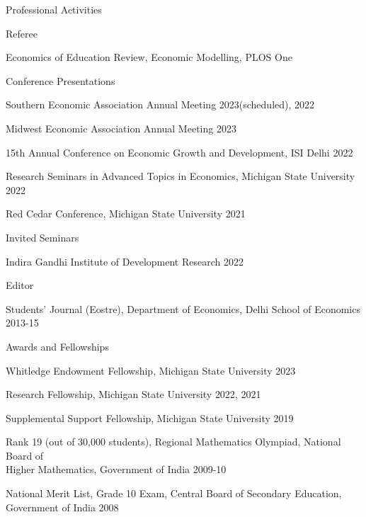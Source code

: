 \documentclass{resume} %
\begin{document}
\begin{rSection}{Professional Activities}
\vspace{.5em}

\begin{rSubsection}{Referee}{}{}{}
\item[] \quad  Economics of Education Review, Economic Modelling, PLOS One
\end{rSubsection}


\begin{rSubsection}{Conference Presentations}{}{}{}

\item[] \quad Southern Economic Association Annual Meeting \hfill{2023(scheduled), 2022}
\item[] \quad Midwest Economic Association Annual Meeting \hfill{2023}
\item[] \quad 15th Annual Conference on Economic Growth and Development, ISI Delhi \hfill{2022}
\item[] \quad Research Seminars in Advanced Topics in Economics, Michigan State University \hfill{2022}
\item[] \quad Red Cedar Conference, Michigan State University \hfill{2021}
\end{rSubsection}

\begin{rSubsection}{Invited Seminars}{}{}{}
	
	\item[] \quad Indira Gandhi Institute of Development Research  \hfill{2022}
	
\end{rSubsection}

\begin{rSubsection}{Editor}{}{}{}
	
	
	\item[] \quad Students' Journal (Eostre), Department of Economics, Delhi School of Economics  \hfill{2013-15}

\end{rSubsection}
\end{rSection}

\vspace{0.5em}

\begin{rSection}{Awards and Fellowships}
\begin{rSubsection}{}{}{}{}
\item[] Whitledge Endowment Fellowship, Michigan State University \hfill{2023}	
\item[] Research Fellowship, Michigan State University \hfill{2022, 2021}
\item[] Supplemental Support Fellowship, Michigan State University \hfill{2019}
\item[] Rank 19 (out of 30,000 students), Regional Mathematics Olympiad, National Board of \\ Higher Mathematics, Government of India \hfill{2009-10}
\item[] National Merit List, Grade 10 Exam, Central Board of Secondary Education, Government of India \hfill{2008}
\end{rSubsection}
\end{rSection}
\end{document}
